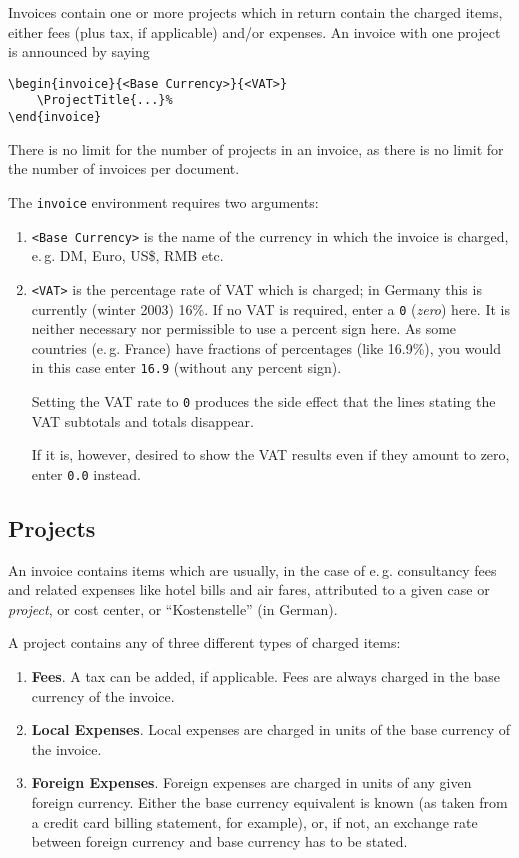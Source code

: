 \documentclass[11pt]{ltxdoc}
\begin{document}
Invoices contain one or more projects which in return contain the charged
items, either fees (plus tax, if applicable) and/or expenses. An
invoice with one project is announced by saying 

\begin{verbatim}
\begin{invoice}{<Base Currency>}{<VAT>}
	\ProjectTitle{...}%
\end{invoice}
\end{verbatim}

There is no limit for the number of projects in an invoice, as there
is no limit for the number of invoices per document.

The \texttt{invoice} environment requires two arguments: 
\begin{enumerate}
	\item \texttt{<Base Currency>} is the name of the currency
		in which the invoice is charged, e.\,g. DM, Euro,
		US\$, RMB etc.
	\item \texttt{<VAT>} is the percentage rate of VAT which is charged;
		in Germany this is currently (winter 2003) 16\%. If
		no VAT is required, enter a \texttt{0}
		(\textit{zero}) here. It is neither necessary nor
		permissible to use a percent sign here. As some
		countries (e.\,g. France) have fractions of
		percentages (like 16.9\%), you would in this case
		enter \verb|16.9| (without any percent sign).

		Setting the VAT rate to \verb-0- produces the side
		effect that the lines stating the VAT subtotals and
		totals disappear.

		If it is, however, desired to show the VAT results
		even if they amount to zero, enter \verb-0.0- instead.
\end{enumerate}


\subsection{Projects}

An invoice contains items which are usually, in the case of e.\,g.
consultancy fees and related expenses like hotel bills and air
fares, attributed to a given case or \textit{project}, or
cost center, or ``Kostenstelle'' (in German).

A project contains any of three different types of charged items:
\begin{enumerate}
	\item \textbf{Fees}. A tax can be added, if applicable. Fees 
		are always charged in the
			base currency
		of the invoice.
	\item \textbf{Local Expenses}. Local expenses are charged in 
		units of the 
			base currency
		of the invoice.
	\item \textbf{Foreign Expenses}. Foreign expenses are charged in 
		units of any given foreign currency. Either the
			base currency
		equivalent is known (as taken from a credit card
		billing statement, for example), or, if not, an
		exchange rate between foreign currency and base
		currency has to be stated.
\end{enumerate}
\end{document}
